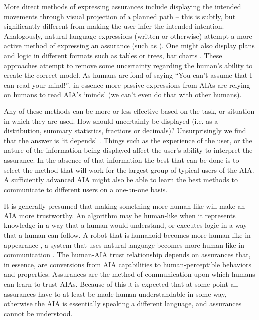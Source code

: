     More direct methods of expressing assurances include displaying the intended movements through visual projection of a planned path \cite{Chadalavada2015-wx} -- this is subtly, but significantly different from making the user infer the intended intention. Analogously, natural language expressions (written or otherwise) attempt a more active method of expressing an assurance (such as \cite{Wang2016-id}). One might also display plans and logic in different formats such as tables or trees, bar charts  \cite{Van_Belle2013-ph, Huysmans2011-th, Hutchins2015-if}. These approaches attempt to remove some uncertainty regarding the human's ability to create the correct model. As humans are fond of saying ``You can't assume that I can read your mind!'', in essence more passive expressions from AIAs are relying on humans to read AIA's `minds' (we can't even do that with other humans).

    Any of these methods can be more or less effective based on the task, or situation in which they are used. How should uncertainly be displayed (i.e. as a distribution, summary statistics, fractions or decimals)?  Unsurprisingly we find that the answer is `it depends' \cite{Chen2014-dk,Wallace2001-fm,Kuhn1997-qc,Lacave2002-cu}. Things such as the experience of the user, or the nature of the information being displayed affect the user's ability to interpret the assurance. In the absence of that information the best that can be done is to select the method that will work for the largest group of typical users of the AIA. A sufficiently advanced AIA might also be able to learn the best methods to communicate to different users on a one-on-one basis.

    It is generally presumed that making something more human-like will make an AIA more trustworthy. An algorithm may be human-like when it represents knowledge in a way that a human would understand, or executes logic in a way that a human can follow. A robot that is humanoid becomes more human-like in appearance \cite{Bainbridge2011-pl}, a system that uses natural language becomes more human-like in communication \cite{Lacave2002-cu}. The human-AIA trust relationship depends on assurances that, in essence, are conversions from AIA capabilities to human-perceptible behaviors and properties.  Assurances are the method of communication upon which humans can learn to trust AIAs. Because of this it is expected that at some point all assurances have to at least be made human-understandable in some way, otherwise the AIA is essentially speaking a different language, and assurances cannot be understood.

